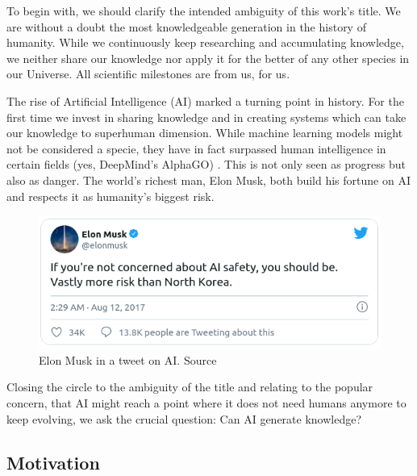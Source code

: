 

To begin with, we should clarify the intended ambiguity of this work's title. We are without a doubt the most knowledgeable generation in the history of humanity. While we continuously keep researching and accumulating knowledge, we neither share our knowledge nor apply it for the better of any other species in our Universe. All scientific milestones are from us, for us. 

The rise of Artificial Intelligence (AI) marked a turning point in history. For the first time we invest in sharing knowledge and in creating systems which can take our knowledge to superhuman dimension. While machine learning models might not be considered a specie, they have in fact surpassed human intelligence in certain fields (yes, DeepMind's AlphaGO) \cite{silver_mastering_2017}. This is not only seen as progress but also as danger. The world's richest man, Elon Musk, both build his fortune on AI and respects it as humanity's biggest risk. 

\begin{figure}[H]
    \centering
    \includegraphics[height=.21\textwidth, keepaspectratio]{data/images/ElonMusk.png}
    \caption{Elon Musk in a tweet on AI. Source \cite{noauthor_elon_nodate}}
    \label{fig1:Elon}
\end{figure}


%     


Closing the circle to the ambiguity of the title and relating to the popular concern, that AI might reach a point where it does not need humans anymore to keep evolving, we ask the crucial question: Can AI generate knowledge? 


\subsection{Motivation}


